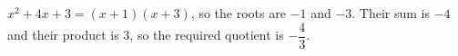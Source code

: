 \(x^2+4x+3=(x+1)(x+3)\), so the roots are \(-1\) and \(-3\). Their sum is \(-4\) and their product is \(3\), so the required quotient is \(\boxed{-\dfrac{4}{3}}\).
